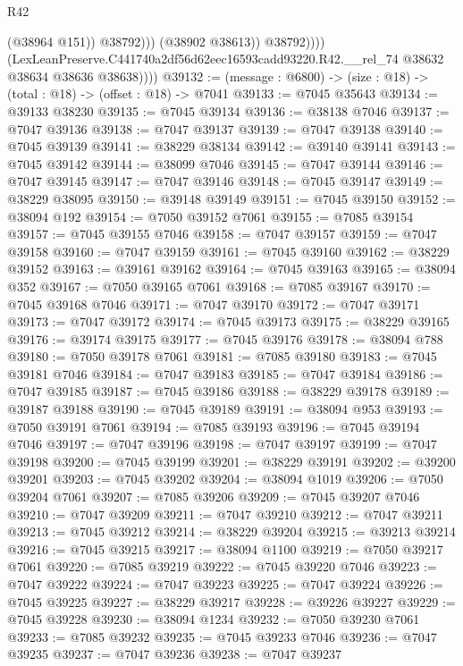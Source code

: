\begin{lexlean}{R42}
\begin{coremodule}
{                            (@38964 @151))
                          @38792)))
                    (@38902 @38613))
                  @38792))))
          (LexLeanPreserve.C441740a2df56d62eec16593cadd93220.R42.__rel_74
            @38632
            @38634
            @38636
            @38638))))
@39132 := (message : @6800) -> (size : @18) -> (total : @18) -> (offset : @18) -> @7041
@39133 := @7045 @35643
@39134 := @39133 @38230
@39135 := @7045 @39134
@39136 := @38138 @7046
@39137 := @7047 @39136
@39138 := @7047 @39137
@39139 := @7047 @39138
@39140 := @7045 @39139
@39141 := @38229 @38134
@39142 := @39140 @39141
@39143 := @7045 @39142
@39144 := @38099 @7046
@39145 := @7047 @39144
@39146 := @7047 @39145
@39147 := @7047 @39146
@39148 := @7045 @39147
@39149 := @38229 @38095
@39150 := @39148 @39149
@39151 := @7045 @39150
@39152 := @38094 @192
@39154 := @7050 @39152 @7061
@39155 := @7085 @39154
@39157 := @7045 @39155 @7046
@39158 := @7047 @39157
@39159 := @7047 @39158
@39160 := @7047 @39159
@39161 := @7045 @39160
@39162 := @38229 @39152
@39163 := @39161 @39162
@39164 := @7045 @39163
@39165 := @38094 @352
@39167 := @7050 @39165 @7061
@39168 := @7085 @39167
@39170 := @7045 @39168 @7046
@39171 := @7047 @39170
@39172 := @7047 @39171
@39173 := @7047 @39172
@39174 := @7045 @39173
@39175 := @38229 @39165
@39176 := @39174 @39175
@39177 := @7045 @39176
@39178 := @38094 @788
@39180 := @7050 @39178 @7061
@39181 := @7085 @39180
@39183 := @7045 @39181 @7046
@39184 := @7047 @39183
@39185 := @7047 @39184
@39186 := @7047 @39185
@39187 := @7045 @39186
@39188 := @38229 @39178
@39189 := @39187 @39188
@39190 := @7045 @39189
@39191 := @38094 @953
@39193 := @7050 @39191 @7061
@39194 := @7085 @39193
@39196 := @7045 @39194 @7046
@39197 := @7047 @39196
@39198 := @7047 @39197
@39199 := @7047 @39198
@39200 := @7045 @39199
@39201 := @38229 @39191
@39202 := @39200 @39201
@39203 := @7045 @39202
@39204 := @38094 @1019
@39206 := @7050 @39204 @7061
@39207 := @7085 @39206
@39209 := @7045 @39207 @7046
@39210 := @7047 @39209
@39211 := @7047 @39210
@39212 := @7047 @39211
@39213 := @7045 @39212
@39214 := @38229 @39204
@39215 := @39213 @39214
@39216 := @7045 @39215
@39217 := @38094 @1100
@39219 := @7050 @39217 @7061
@39220 := @7085 @39219
@39222 := @7045 @39220 @7046
@39223 := @7047 @39222
@39224 := @7047 @39223
@39225 := @7047 @39224
@39226 := @7045 @39225
@39227 := @38229 @39217
@39228 := @39226 @39227
@39229 := @7045 @39228
@39230 := @38094 @1234
@39232 := @7050 @39230 @7061
@39233 := @7085 @39232
@39235 := @7045 @39233 @7046
@39236 := @7047 @39235
@39237 := @7047 @39236
@39238 := @7047 @39237
}
\end{coremodule}
\end{lexlean}
